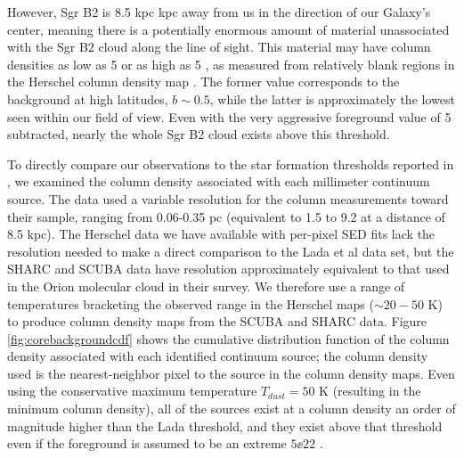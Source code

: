 \documentclass[twocolumn]{aastex61}
\newcommand{\dsgrb}{8.5 kpc\xspace}
\begin{document}
However, Sgr B2 is \dsgrb kpc away from us in the direction of our Galaxy's
center, meaning there is a potentially enormous amount of material unassociated
with the Sgr B2 cloud along the line of sight.  This material may have column
densities as low as
5 \persc or as high as 5 \persc, as measured from relatively
blank regions in the Herschel column density map \citep{Battersby2011a}.  The
former value corresponds to
the background at high latitudes, $b\sim0.5$, while the latter  is
approximately the lowest seen within our field of view. 
Even with the very aggressive foreground value of 5 \persc subtracted,
nearly the whole Sgr B2 cloud exists above this threshold.

To directly compare our observations to the star formation thresholds reported
in \citet{Lada2010a}, we examined the column density associated with each
millimeter continuum source.  The \citet{Lada2010a} data used a variable
resolution for the column measurements toward their sample, ranging from
0.06-0.35 pc (equivalent to 1.5 to 9.2 \arcsec at a distance of \dsgrb).  The
Herschel data we have available with per-pixel SED fits lack the resolution
needed to make a direct comparison to the Lada et al data set, but the SHARC
and SCUBA data have resolution approximately equivalent to that used in the
Orion molecular cloud in their survey.  We therefore use a range of temperatures
bracketing the observed range in the Herschel maps ($\sim20-50$ K) to produce
column density maps from the SCUBA and SHARC data.  Figure
\ref{fig:corebackgroundcdf} shows the cumulative distribution function of the
column density associated with each identified continuum source; the column
density used is the nearest-neighbor pixel to the source in the column density
maps.  Even using the conservative maximum temperature $T_{dust}=50$ K
(resulting in the minimum column density), all of the sources exist at a column
density an order of magnitude higher than the Lada threshold, and they exist
above that threshold even if the foreground is assumed to be an extreme $5\ee{22}$
\persc.
\end{document}
